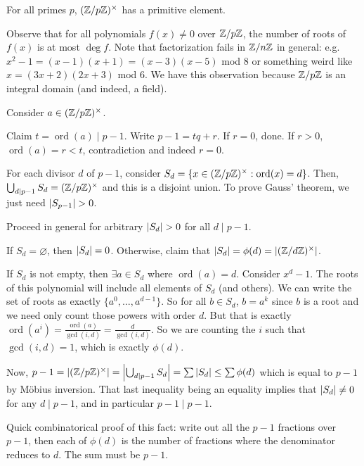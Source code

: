 \documentclass[notes]{agony}
\newcommand{\ord}{\operatorname{ord}}
\begin{document}
\begin{theorem}
    For all primes $p$, $(\mathbb{Z}/p\mathbb{Z})^\times$ has a primitive element.
\end{theorem}
\begin{prf}
    Observe that for all polynomials $f(x) \neq 0$ over $\mathbb{Z}/p\mathbb{Z}$,
    the number of roots of $f(x)$ is at most $\deg f$.
    Note that factorization fails in $\mathbb{Z}/n\mathbb{Z}$ in general:
    e.g. $x^2 - 1 = (x-1)(x+1) = (x-3)(x-5)$ mod 8
    or something weird like $x = (3x+2)(2x+3)$ mod 6.
    We have this observation because $\mathbb{Z}/p\mathbb{Z}$ is an integral domain (and indeed, a field).

    Consider $a \in (\mathbb{Z}/p\mathbb{Z})^\times$.

    Claim $t=\ord(a) \mid p-1$.
    Write $p-1=tq+r$. If $r=0$, done.
    If $r > 0$, $\ord(a) = r < t$, contradiction and indeed $r=0$.

    For each divisor $d$ of $p-1$, consider
    $S_d = \{x \in (\Z/p\Z)^\times : \ord(x) = d\}$.
    Then, $\bigcup_{d \mid p-1}S_d = (\mathbb{Z}/p\mathbb{Z})^\times$
    and this is a disjoint union.
    To prove Gauss' theorem, we just need $\abs{S_{p-1}} > 0$.

    Proceed in general for arbitrary $\abs{S_d} > 0$ for all $d \mid p-1$.

    If $S_d = \varnothing$, then $\abs{S_d} = 0$.
    Otherwise, claim that $\abs{S_d} = \phi(d) = \abs{(\mathbb{Z}/d\mathbb{Z})^\times}$.

    If $S_d$ is not empty, then $\exists a \in S_d$ where $\ord(a) = d$.
    Consider $x^d - 1$.
    The roots of this polynomial will include all elements of $S_d$ (and others).
    We can write the set of roots as exactly $\{a^0,\dotsc,a^{d-1}\}$.
    So for all $b \in S_d$, $b = a^k$ since $b$ is a root
    and we need only count those powers with order $d$.
    But that is exactly $\ord(a^i) = \frac{\ord(a)}{\gcd(i,d)} = \frac{d}{\gcd(i,d)}$.
    So we are counting the $i$ such that $\gcd(i,d) = 1$,
    which is exactly $\phi(d)$.

    Now, $p-1 = \abs{(\mathbb{Z}/p\mathbb{Z})^\times} = \abs{\bigcup_{d \mid p-1}S_d} = \sum\abs{S_d} \leq \sum \phi(d)$ which is equal to $p-1$ by M\"obius inversion.
    That last inequality being an equality implies that
    $\abs{S_d} \neq 0$ for any $d \mid p-1$, and in particular $p-1 \mid p-1$.

    Quick combinatorical proof of this fact:
    write out all the $p-1$ fractions over $p-1$,
    then each of $\phi(d)$ is the number of fractions
    where the denominator reduces to $d$. The sum must be $p-1$.
\end{prf}
\end{document}
